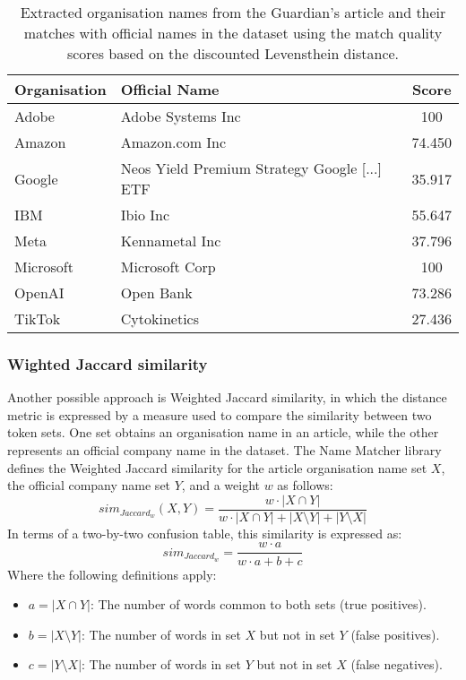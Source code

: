 \begin{table}[ht]
    \centering
    \caption{Extracted organisation names from the Guardian's article and their matches with official names in the dataset using the match quality scores based on the discounted Levensthein distance.}
    \label{table:discounted-levenshtein-distance}
    \begin{tabular}{l l c}
        \hline
        Organisation & Official Name & Score \\
        \hline
        Adobe & Adobe Systems Inc & 100 \\
        Amazon & Amazon.com Inc & 74.450 \\
        Google & Neos Yield Premium Strategy Google [...] ETF & 35.917 \\
        IBM & Ibio Inc & 55.647 \\
        Meta & Kennametal Inc & 37.796 \\
        Microsoft & Microsoft Corp & 100 \\
        OpenAI & Open Bank & 73.286 \\
        TikTok & Cytokinetics & 27.436 \\
        \hline
    \end{tabular}
\end{table}

\subsubsection*{Wighted Jaccard similarity}
\label{subsubsec:wighted-jaccard-similarity}
Another possible approach is Weighted Jaccard similarity, in which the distance metric is expressed by a measure used to compare the similarity between two token sets. One set obtains an organisation name in an article, while the other represents an official company name in the dataset. The Name Matcher library defines the Weighted Jaccard similarity for the article organisation name set $X$, the official company name set $Y$, and a weight $w$ as follows:
\begin{equation}
    \label{eq:weighted-jaccard-similarity}
    sim_{Jaccard_w}(X, Y) = \frac{w \cdot |X \cap Y|}
    {w \cdot |X \cap Y| + |X \setminus Y| + |Y \setminus X|}
\end{equation}
In terms of a two-by-two confusion table, this similarity is expressed as:
\begin{equation}
    sim_{Jaccard_w} = \frac{w\cdot a}{w\cdot a+b+c}
\end{equation}
Where the following definitions apply:
\begin{itemize}
    \item $a = |X \cap Y|$: The number of words common to both sets (true positives).
    \item $b = |X \setminus Y|$: The number of words in set $X$ but not in set $Y$ (false positives).
    \item $c = |Y \setminus X|$: The number of words in set $Y$ but not in set $X$ (false negatives).
\end{itemize}

